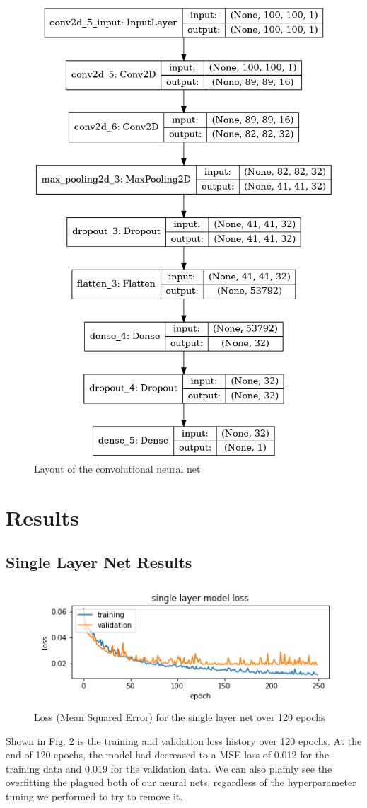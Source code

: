 \documentclass[conference]{IEEEtran}
\begin{document}
\begin{figure}[htbp]
\centerline{\includegraphics[width=0.5\linewidth]{./Images/convNet.png}}
\caption{Layout of the convolutional neural net}
\label{fig:ConvNetArchitecture}
\end{figure}


\section{Results}

\subsection{Single Layer Net Results}

\begin{figure}[htbp]
\centerline{\includegraphics[width=0.75\linewidth]{./Images/SingleModelLoss.png}}
\caption{Loss (Mean Squared Error) for the single layer net over 120 epochs}
\label{fig:SingleModelLoss}
\end{figure}

Shown in Fig. \ref{fig:SingleModelLoss} is the training and validation loss history over 120 epochs. At the end of 120 epochs, the model had decreased to a MSE loss of 0.012 for the training data and 0.019 for the validation data. We can also plainly see the overfitting the plagued both of our neural nets, regardless of the hyperparameter tuning we performed to try to remove it.
\end{document}
